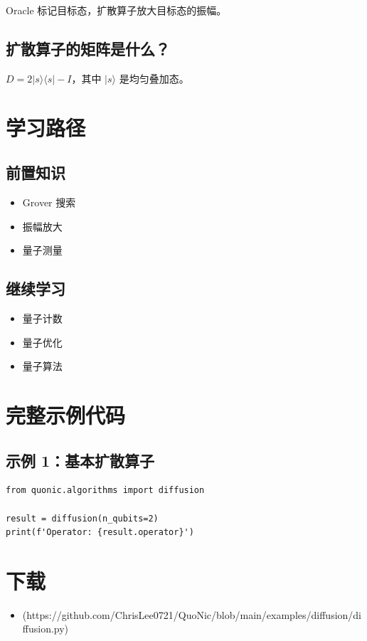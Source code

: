 \documentclass[12pt,a4paper]{article}
\begin{document}
Oracle 标记目标态，扩散算子放大目标态的振幅。

\subsection{扩散算子的矩阵是什么？}

$D = 2|s\rangle\langle s| - I$，其中 $|s\rangle$ 是均匀叠加态。

\section{学习路径}

\subsection{前置知识}
\begin{itemize}
  \item Grover 搜索
  \item 振幅放大
  \item 量子测量
\end{itemize}

\subsection{继续学习}
\begin{itemize}
  \item 量子计数
  \item 量子优化
  \item 量子算法
\end{itemize}

\section{完整示例代码}

\subsection{示例 1：基本扩散算子}

\begin{verbatim}
from quonic.algorithms import diffusion

result = diffusion(n_qubits=2)
print(f'Operator: {result.operator}')
\end{verbatim}

\section{下载}

\begin{itemize}
  \item [diffusion.py](https://github.com/ChrisLee0721/QuoNic/blob/main/examples/diffusion/diffusion.py)
\end{itemize}
\end{document}
